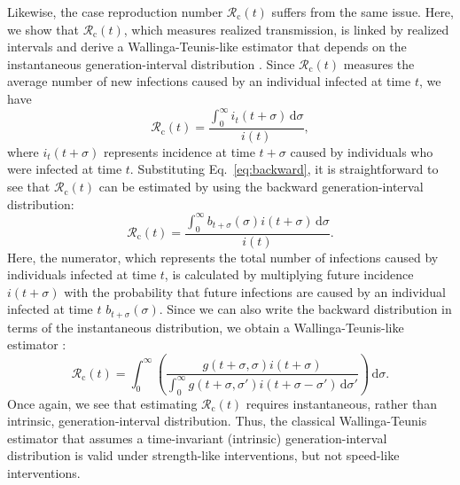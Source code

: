 \documentclass[12pt]{article}
\newcommand{\eref}[1]{Eq.~\ref{eq:#1}}
\newcommand{\Rx}[1]{\ensuremath{{\mathcal R}_{#1}}\xspace}
\newcommand{\Rc}{\Rx{\mathrm{c}}}
\newcommand{\dd}[1]{\ensuremath{\, \mathrm{d}#1}}
\newcommand{\dsigma}{\dd{\sigma}}
\begin{document}
Likewise, the case reproduction number $\Rc(t)$ suffers from the same issue. 
Here, we show that $\Rc(t)$, which measures realized transmission, is linked by realized intervals and derive a Wallinga-Teunis-like estimator that depends on the instantaneous generation-interval distribution \citep{wallinga2004different}.
Since $\Rc(t)$ measures the average number of new infections caused by an individual infected at time $t$, we have
\begin{equation}
\Rc(t) = \frac{\int_0^\infty i_t(t+\sigma) \dsigma}{i(t)},
\end{equation}
where $i_t(t+\sigma)$ represents incidence at time $t+\sigma$ caused by individuals who were infected at time $t$.
Substituting \eref{backward}, it is straightforward to see that $\Rc(t)$ can be estimated by using the backward generation-interval distribution:
\begin{equation}
\Rc(t) = \frac{\int_0^\infty b_{t+\sigma}(\sigma) i(t+\sigma) \dsigma}{i(t)}.
\end{equation}
Here, the numerator, which represents the total number of infections caused by individuals infected at time $t$, is calculated by multiplying future incidence $i(t+\sigma)$ with the probability that future infections are caused by an individual infected at time $t$ $b_{t+\sigma}(\sigma)$.
Since we can also write the backward distribution in terms of the instantaneous distribution, we obtain a Wallinga-Teunis-like estimator \citep{wallinga2004different}:
\begin{equation}
\Rc(t) = \int_0^\infty \left(\frac{g(t+\sigma,\sigma) i(t+\sigma)}{\int_0^\infty g(t+\sigma,\sigma') i(t+\sigma-\sigma') \dsigma'} \right) \dsigma.
\end{equation}
Once again, we see that estimating $\Rc(t)$ requires instantaneous, rather than intrinsic, generation-interval distribution.
Thus, the classical Wallinga-Teunis estimator that assumes a time-invariant (intrinsic) generation-interval distribution is valid under strength-like interventions, but not speed-like interventions.
\end{document}
